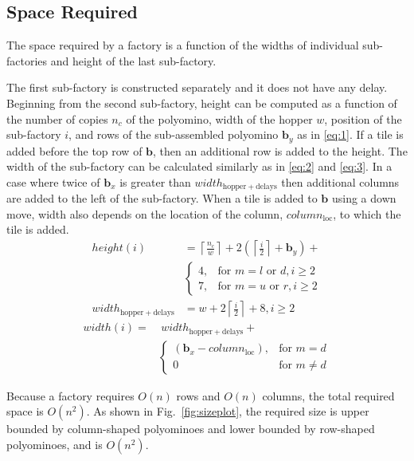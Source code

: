 \subsection{Space Required}\label{sec:requiredSpace}
The space required by a factory is a function of the widths of individual sub-factories and height of the last sub-factory.


The first sub-factory is constructed separately and it does not have any delay.
Beginning from the second sub-factory, height can be computed as a function of the number of copies $n_c$ of the polyomino, width of the hopper $w$, position of the sub-factory $i$, and rows of the sub-assembled polyomino $\mathbf{b}_y$ as in \eqref{eq:1}. If a tile is added before the top row of $\mathbf{b}$, then an additional row is added to the height.
The width of the sub-factory can be calculated similarly as in \eqref{eq:2} and \eqref{eq:3}. 
In a case where twice of $\mathbf{b}_x$ is greater than $width_{\mathrm{hopper}+\mathrm{delays}}$ then additional columns are added to the left of the sub-factory. 
When a tile is added to $\mathbf{b}$ using a down move, width also depends on the location of the column, $column_{\mathrm{loc}}$, to which the tile is added.  
\begin{align}
height(i) &= \left \lceil{ \frac{n_c}{w}}\right \rceil+2\left(\left \lceil{\frac{i}{2}}\right \rceil+\mathbf{b}_y\right)+ \nonumber \\
&\begin{cases}
  4,&\text{for } m = l \text{ or } d, i \geq 2\\
7,&\text{for } m = u \text{ or } r, i \geq 2 
\end{cases}\label{eq:1} \\
width_{\mathrm{hopper}+\mathrm{delays}}&=w+2\left \lceil{ \frac{i}{2}}\right \rceil+8,  i \geq 2 \label{eq:2} \end{align}
\begin{align}
width(i)=&~width_{\mathrm{hopper}+\mathrm{delays}} +\nonumber\\
&\begin{cases}
(\mathbf{b}_x-column_{\mathrm{loc}}),&\text{for } m = d \\
0 &\text{for } m \neq d  \label{eq:3}
\end{cases}
\end{align}
  

Because a factory requires $O(n)$ rows and $O(n)$ columns, the total required space is $O(n^2)$.
As shown in Fig.~\ref{fig:sizeplot}, the required size is  upper bounded by column-shaped polyominoes and lower bounded by row-shaped polyominoes, and is $O(n^2)$.

